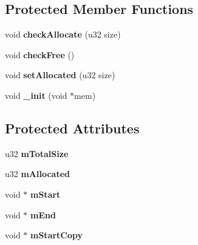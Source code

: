 \subsection*{Protected Member Functions}
\begin{DoxyCompactItemize}
\item 
void {\bfseries check\+Allocate} (u32 size)\hypertarget{classDE_1_1Allocator_adfa4cc6e2a100ced016d76dad996ec03}{}\label{classDE_1_1Allocator_adfa4cc6e2a100ced016d76dad996ec03}

\item 
void {\bfseries check\+Free} ()\hypertarget{classDE_1_1Allocator_a77aa1061f03024b4908d1df48b5f6a9b}{}\label{classDE_1_1Allocator_a77aa1061f03024b4908d1df48b5f6a9b}

\item 
void {\bfseries set\+Allocated} (u32 size)\hypertarget{classDE_1_1Allocator_a1ba0de66726af5f264a32bbdc56e09e6}{}\label{classDE_1_1Allocator_a1ba0de66726af5f264a32bbdc56e09e6}

\item 
void {\bfseries \+\_\+init} (void $\ast$mem)\hypertarget{classDE_1_1Allocator_a26ac571c71cac6e35eaadef60b145d04}{}\label{classDE_1_1Allocator_a26ac571c71cac6e35eaadef60b145d04}

\end{DoxyCompactItemize}
\subsection*{Protected Attributes}
\begin{DoxyCompactItemize}
\item 
u32 {\bfseries m\+Total\+Size}\hypertarget{classDE_1_1Allocator_aceae0739788b604e09461cb87c9cee33}{}\label{classDE_1_1Allocator_aceae0739788b604e09461cb87c9cee33}

\item 
u32 {\bfseries m\+Allocated}\hypertarget{classDE_1_1Allocator_a5b5fdd9a1d11ae939f0dafee6aa65be7}{}\label{classDE_1_1Allocator_a5b5fdd9a1d11ae939f0dafee6aa65be7}

\item 
void $\ast$ {\bfseries m\+Start}\hypertarget{classDE_1_1Allocator_a4b8cbee3d0d9544e88ebdfaa62902b90}{}\label{classDE_1_1Allocator_a4b8cbee3d0d9544e88ebdfaa62902b90}

\item 
void $\ast$ {\bfseries m\+End}\hypertarget{classDE_1_1Allocator_adef4833178f44b6c047d47945d5c93d4}{}\label{classDE_1_1Allocator_adef4833178f44b6c047d47945d5c93d4}

\item 
void $\ast$ {\bfseries m\+Start\+Copy}\hypertarget{classDE_1_1Allocator_a26a25b124b6a727393ecaa51e8c9925b}{}\label{classDE_1_1Allocator_a26a25b124b6a727393ecaa51e8c9925b}

\end{DoxyCompactItemize}


